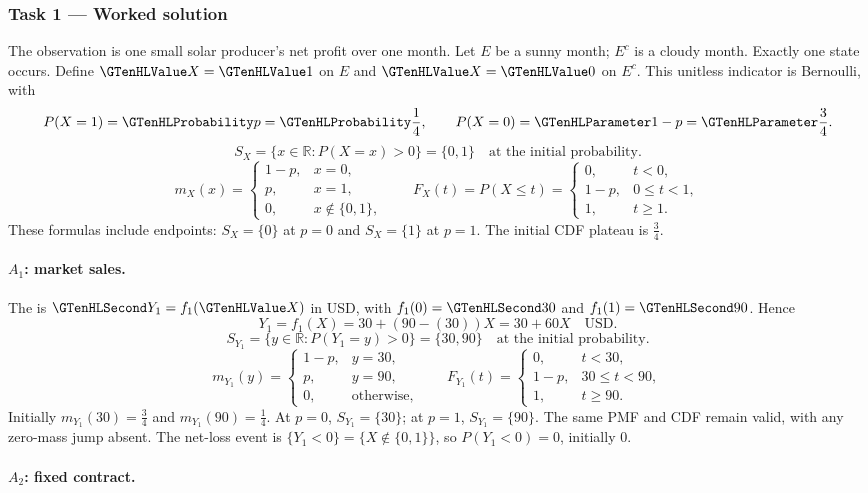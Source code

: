 \subsubsection*{Task 1 --- Worked solution}\label{sol:c3-energy-model}
The observation is one small solar producer's net profit over one month. Let $E$ be a sunny month; $E^c$ is a cloudy month. Exactly one state occurs. Define $\Indicator{X}=\Indicator{1}$ on $E$ and $\Indicator{X}=\Indicator{0}$ on $E^c$. This unitless indicator is Bernoulli, with
\[P(X=1)=\SuccessProb{p}=\SuccessProb{\frac{1}{4}},\qquad P(X=0)=\FailureProb{1-p}=\FailureProb{\frac{3}{4}}.\]
\[S_X=\{x\in\mathbb R:P(X=x)>0\}=\{0,1\}\quad\text{at the initial probability}.\]
\[m_X(x)=\begin{cases}1-p,&x=0,\\p,&x=1,\\0,&x\notin\{0,1\},\end{cases}\qquad F_X(t)=P(X\leq t)=\begin{cases}0,&t<0,\\1-p,&0\leq t<1,\\1,&t\geq1.\end{cases}\]
These formulas include endpoints: $S_X=\{0\}$ at $p=0$ and $S_X=\{1\}$ at $p=1$. The initial CDF plateau is $\frac{3}{4}$.
\paragraph{$A_1$: market sales.}
The  is $\Money{Y_1}=f_1(\Indicator{X})$ in USD, with $f_1(0)=\Money{30}$ and $f_1(1)=\Money{90}$. Hence
\[Y_1=f_1(X)=30+(90-(30))X=30+60X\quad\text{USD}.\]
\[S_{Y_1}=\{y\in\mathbb R:P(Y_1=y)>0\}=\{30,90\}\quad\text{at the initial probability}.\]
\[m_{Y_1}(y)=\begin{cases}1-p,&y=30,\\p,&y=90,\\0,&\text{otherwise},\end{cases}\qquad F_{Y_1}(t)=\begin{cases}0,&t<30,\\1-p,&30\leq t<90,\\1,&t\geq 90.\end{cases}\]
Initially $m_{Y_1}(30)=\frac{3}{4}$ and $m_{Y_1}(90)=\frac{1}{4}$. At $p=0$, $S_{Y_1}=\{30\}$; at $p=1$, $S_{Y_1}=\{90\}$. The same PMF and CDF remain valid, with any zero-mass jump absent.
The net-loss event is $\{Y_1<0\}=\{X\notin\{0,1\}\}$, so $P(Y_1<0)=0$, initially $0$.
\paragraph{$A_2$: fixed contract.}

